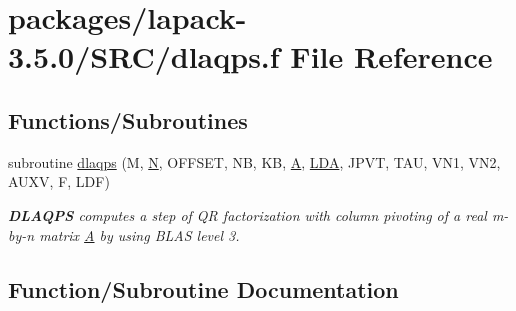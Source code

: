 \hypertarget{dlaqps_8f}{}\section{packages/lapack-\/3.5.0/\+S\+R\+C/dlaqps.f File Reference}
\label{dlaqps_8f}
\subsection*{Functions/\+Subroutines}
\begin{DoxyCompactItemize}
\item 
subroutine \hyperlink{dlaqps_8f_ae9390b8aa28d639a2e67f2aa33583e97}{dlaqps} (M, \hyperlink{polmisc_8c_a0240ac851181b84ac374872dc5434ee4}{N}, O\+F\+F\+S\+E\+T, N\+B, K\+B, \hyperlink{classA}{A}, \hyperlink{example__user_8c_ae946da542ce0db94dced19b2ecefd1aa}{L\+D\+A}, J\+P\+V\+T, T\+A\+U, V\+N1, V\+N2, A\+U\+X\+V, F, L\+D\+F)
\begin{DoxyCompactList}\small\item\em {\bfseries D\+L\+A\+Q\+P\+S} computes a step of Q\+R factorization with column pivoting of a real m-\/by-\/n matrix \hyperlink{classA}{A} by using B\+L\+A\+S level 3. \end{DoxyCompactList}\end{DoxyCompactItemize}


\subsection{Function/\+Subroutine Documentation}
\hypertarget{dlaqps_8f_ae9390b8aa28d639a2e67f2aa33583e97}{}
